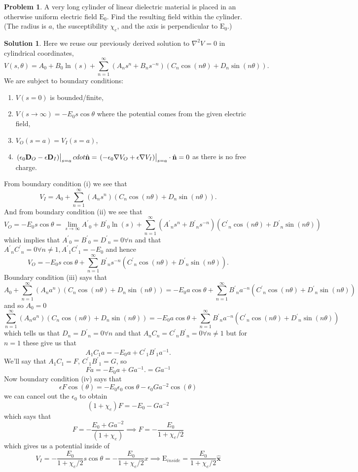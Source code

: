 \documentclass[10pt]{article}
\theoremstyle{definition}
\newtheorem{problem}{Problem}
\newtheorem{soln}{Solution}
\newcommand{\ux}{\hat{\mathbf{x}}}
\newcommand{\uv}[1]{\hat{\bv{{#1}}}}
\newcommand{\pr}[1]{{#1^\prime}}
\newcommand{\bv}[1]{\bm{\mathrm{#1}}}
\begin{document}
\begin{problem}
A very long cylinder of linear dielectric material is placed in an otherwise uniform electric field $\bv{E}_0$. Find the resulting field within the cylinder.
(The radius is $a$, the susceptibility $\chi_e$, and the axis is perpendicular to $\bv{E}_0$.)
\end{problem}
\begin{soln}
  Here we reuse our previously derived solution to $\nabla^2V=0$ in cylindrical coordinates,
  $$V(s,\theta)=A_0+B_0\ln(s)+\sum_{n=1}^{\infty}\left(A_ns^n+B_ns^{-n}\right)\left(C_n\cos(n\theta)+D_n\sin(n\theta)\right).$$
  We are subject to boundary conditions:
  \begin{enumerate}[label=(\roman*)]
    \item $V(s=0)$ is bounded/finite,
    \item $V(s\to\infty)=-E_0s\cos\theta$ where the potential comes from the given electric field,
    \item $V_{O}(s=a)=V_{I}(s=a)$,
    \item $\eval{(\epsilon_0\bv{D}_O-\epsilon \bv{D}_I)}_{s=a}cdot \uv{n}=\eval{(-\epsilon_0\nabla V_O+\epsilon \nabla V_I)}_{s=a}\cdot \uv{n}=0$ as there is no free charge.
  \end{enumerate}
  From boundary condition (i) we see that 
  $$V_I=A_0+\sum_{n=1}^{\infty}\left(A_ns^n\right)\left(C_n\cos(n\theta)+D_n\sin(n\theta)\right).$$
  And from boundary condition (ii) we see that 
  $$V_O=-E_0s\cos\theta=\lim_{s\to\infty}\pr{A}_0+\pr{B}_0\ln(s)+\sum_{n=1}^{\infty}\left(\pr{A}_ns^n+\pr{B}_ns^{-n}\right)\left(\pr{C}_n\cos(n\theta)+\pr{D}_n\sin(n\theta)\right)$$
  which implies that $\pr{A}_0=\pr{B}_0=\pr{D}_n=0\forall n$ and that $\pr{A}_n\pr{C}_n=0\forall n\neq1, \pr{A}_1\pr{C}_1=-E_0$ and hence 
  $$V_O=-E_0s\cos\theta+\sum_{n=1}^{\infty}\pr{B}_ns^{-n}\left(\pr{C}_n\cos(n\theta)+\pr{D}_n\sin(n\theta)\right).$$
  Boundary condition (iii) says that 
  $$
  A_0+\sum_{n=1}^{\infty}\left(A_na^n\right)\left(C_n\cos(n\theta)+D_n\sin(n\theta)\right)
  =
  -E_0a\cos\theta+\sum_{n=1}^{\infty}\pr{B}_na^{-n}\left(\pr{C}_n\cos(n\theta)+\pr{D}_n\sin(n\theta)\right)
  $$
  and so $A_0=0$
  $$
  \sum_{n=1}^{\infty}\left(A_na^n\right)\left(C_n\cos(n\theta)+D_n\sin(n\theta)\right)
  =
  -E_0a\cos\theta+\sum_{n=1}^{\infty}\pr{B}_na^{-n}\left(\pr{C}_n\cos(n\theta)+\pr{D}_n\sin(n\theta)\right)
  $$
  which tells us that $D_n=\pr{D}_n=0\forall n$ and that $A_nC_n=\pr{C}_n\pr{B}_n=0\forall n\neq 1$
  but for $n=1$ these give us that 
  $$A_1C_1a=-E_0a+\pr{C}_1\pr{B}_1a^{-1}.$$
  We'll say that $A_1C_1=F$, $\pr{C}_1\pr{B}_1=G$, so 
 $$ 
    Fa=-E_0a+Ga^{-1}.
    =Ga^{-1}
  $$
  Now boundary condition (iv) says that
    $$
  \epsilon F\cos(\theta)
  =
  -E_0\epsilon_0\cos\theta-\epsilon_0Ga^{-2}\cos(\theta)
  $$
  we can cancel out the $\epsilon_0$ to obtain 
    $$
  (1+\chi_e)F
  =
  -E_0-Ga^{-2}
  $$
  which says that 
      $$
  F
  =-\frac{E_0+Ga^{-2}}{(1+\chi_e)} \implies F=-\frac{E_0}{1+\chi_e/2}
  $$
  which gives us a potential inside of 
  $$V_I=-\frac{E_0}{1+\chi_e/2}s\cos\theta=-\frac{E_0}{1+\chi_e/2}x\implies \bv{E}_{inside}=\frac{E_0}{1+\chi_e/2}\ux$$
\end{soln}
\end{document}
